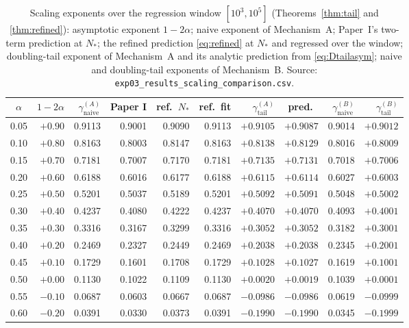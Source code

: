 \documentclass[11pt,reqno]{amsart}
\theoremstyle{plain}
\theoremstyle{definition}
\theoremstyle{remark}
\numberwithin{equation}{section}
\newcommand{\gnaive}{\gamma_{\mathrm{naive}}}
\newcommand{\gtail}{\gamma_{\mathrm{tail}}}
\begin{document}
\begin{table}[p]
\centering\footnotesize\setlength{\tabcolsep}{3.5pt}
\caption{Scaling exponents over the regression window $[10^3,10^5]$ (Theorems~\ref{thm:tail} and \ref{thm:refined}): asymptotic exponent $1-2\alpha$; naive exponent of Mechanism~A; Paper~I's two-term prediction at $N_*$; the refined prediction \eqref{eq:refined} at $N_*$ and regressed over the window; doubling-tail exponent of Mechanism~A and its analytic prediction from \eqref{eq:Dtailasym}; naive and doubling-tail exponents of Mechanism~B. Source: \texttt{exp03\_results\_scaling\_comparison.csv}.}
\label{tab:scaling}
\scriptsize\setlength{\tabcolsep}{3pt}
\begin{tabular}{@{}crrrrrrrrr@{}}
\toprule
$\alpha$ & $1-2\alpha$ & $\gnaive^{(A)}$ & Paper I & ref.\ $N_*$ & ref.\ fit & $\gtail^{(A)}$ & pred.\ & $\gnaive^{(B)}$ & $\gtail^{(B)}$ \\
\midrule
0.05 & $+0.90$ & 0.9113 & 0.9001 & 0.9090 & 0.9113 & $+0.9105$ & $+0.9087$ & 0.9014 & $+0.9012$ \\
0.10 & $+0.80$ & 0.8163 & 0.8003 & 0.8147 & 0.8163 & $+0.8138$ & $+0.8129$ & 0.8016 & $+0.8009$ \\
0.15 & $+0.70$ & 0.7181 & 0.7007 & 0.7170 & 0.7181 & $+0.7135$ & $+0.7131$ & 0.7018 & $+0.7006$ \\
0.20 & $+0.60$ & 0.6188 & 0.6016 & 0.6177 & 0.6188 & $+0.6115$ & $+0.6114$ & 0.6027 & $+0.6003$ \\
0.25 & $+0.50$ & 0.5201 & 0.5037 & 0.5189 & 0.5201 & $+0.5092$ & $+0.5091$ & 0.5048 & $+0.5002$ \\
0.30 & $+0.40$ & 0.4237 & 0.4080 & 0.4222 & 0.4237 & $+0.4070$ & $+0.4070$ & 0.4093 & $+0.4001$ \\
0.35 & $+0.30$ & 0.3316 & 0.3167 & 0.3299 & 0.3316 & $+0.3052$ & $+0.3052$ & 0.3182 & $+0.3001$ \\
0.40 & $+0.20$ & 0.2469 & 0.2327 & 0.2449 & 0.2469 & $+0.2038$ & $+0.2038$ & 0.2345 & $+0.2001$ \\
0.45 & $+0.10$ & 0.1729 & 0.1601 & 0.1708 & 0.1729 & $+0.1028$ & $+0.1027$ & 0.1619 & $+0.1001$ \\
0.50 & $+0.00$ & 0.1130 & 0.1022 & 0.1109 & 0.1130 & $+0.0020$ & $+0.0019$ & 0.1039 & $+0.0001$ \\
0.55 & $-0.10$ & 0.0687 & 0.0603 & 0.0667 & 0.0687 & $-0.0986$ & $-0.0986$ & 0.0619 & $-0.0999$ \\
0.60 & $-0.20$ & 0.0391 & 0.0330 & 0.0373 & 0.0391 & $-0.1990$ & $-0.1990$ & 0.0345 & $-0.1999$ \\

\end{tabular}
\end{table}
\end{document}

